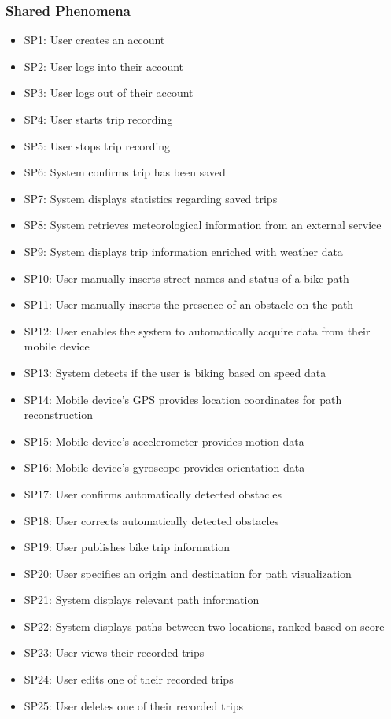 \subsubsection{Shared Phenomena}
\begin{itemize}
    \item SP1: User creates an account
    \item SP2: User logs into their account
    \item SP3: User logs out of their account
    \item SP4: User starts trip recording
    \item SP5: User stops trip recording
    \item SP6: System confirms trip has been saved
    \item SP7: System displays statistics regarding saved trips
    \item SP8: System retrieves meteorological information from an external service
    \item SP9: System displays trip information enriched with weather data
    \item SP10: User manually inserts street names and status of a bike path
    \item SP11: User manually inserts the presence of an obstacle on the path
    \item SP12: User enables the system to automatically acquire data from their mobile device
    \item SP13: System detects if the user is biking based on speed data
    \item SP14: Mobile device's GPS provides location coordinates for path reconstruction
    \item SP15: Mobile device's accelerometer provides motion data
    \item SP16: Mobile device's gyroscope provides orientation data
    \item SP17: User confirms automatically detected obstacles
    \item SP18: User corrects automatically detected obstacles
    \item SP19: User publishes bike trip information
    \item SP20: User specifies an origin and destination for path visualization
    \item SP21: System displays relevant path information
    \item SP22: System displays paths between two locations, ranked based on score
    \item SP23: User views their recorded trips
    \item SP24: User edits one of their recorded trips
    \item SP25: User deletes one of their recorded trips
\end{itemize}

